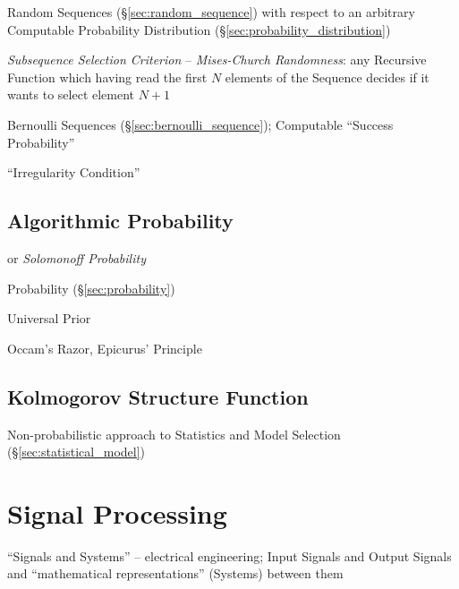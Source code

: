 Random Sequences (\S\ref{sec:random_sequence}) with respect to an arbitrary
Computable Probability Distribution (\S\ref{sec:probability_distribution})

\emph{Subsequence Selection Criterion} --
\emph{Mises-Church Randomness}: any Recursive Function which having read the
first $N$ elements of the Sequence decides if it wants to select element $N+1$

Bernoulli Sequences (\S\ref{sec:bernoulli_sequence}); Computable ``Success
Probability''

``Irregularity Condition''



\subsection{Algorithmic Probability}\label{sec:algorithmic_probability}

or \emph{Solomonoff Probability}

\fist Probability (\S\ref{sec:probability})

Universal Prior

Occam's Razor, Epicurus' Principle



\subsection{Kolmogorov Structure Function}\label{sec:kolmogorov_structure}

Non-probabilistic approach to Statistics and Model Selection
(\S\ref{sec:statistical_model})



\section{Signal Processing}\label{sec:signal_processing}

``Signals and Systems'' -- electrical engineering; Input Signals and Output
Signals and ``mathematical representations'' (Systems) between them

